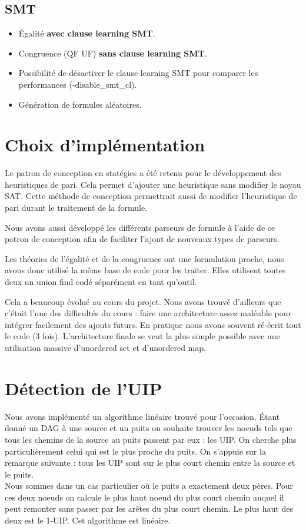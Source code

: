 \documentclass{article}
\begin{document}
\subsection{SMT}
\begin{itemize}
\item Égalité \textbf{avec clause learning SMT}.
\item Congruence (QF UF) \textbf{sans clause learning SMT}.
\item Possibilité de désactiver le clause learning SMT pour comparer les performances (-disable\_smt\_cl).
\item Génération de formules aléatoires.
\end{itemize}

\section{Choix d'implémentation}
Le patron de conception en statégies a été retenu pour le développement des heuristiques de pari. Cela permet d'ajouter une heuristique sans modifier le noyau SAT. 
Cette méthode de conception permettrait aussi de modifier l'heuristique de pari durant le traitement de la formule.

Nous avons aussi développé les différents parseurs de formule à l'aide de ce patron de conception afin de faciliter l'ajout de nouveaux types de parseurs.

Les théories de l'égalité et de la congruence ont une formulation proche, nous avons donc utilisé la même base de code pour les traiter.
Elles utilisent toutes deux un union find codé séparément en tant qu'outil.

Cela a beaucoup évolué au cours du projet. Nous avons trouvé d'ailleurs que c'était l'une des difficultés du cours : faire une architecture assez maléable pour intégrer facilement des ajouts futurs. En pratique nous avons souvent ré-écrit tout le code (3 fois).
L'architecture finale se veut la plus simple possible avec une utilisation massive d'unordered set et d'unordered map.

\section{Détection de l'UIP}
Nous avons implémenté un algorithme linéaire trouvé pour l'occasion. Étant donné un DAG à une source et un puits on souhaite trouver les noeuds tels que tous les chemins de la source au puits passent par eux : les UIP. On cherche plus particulièrement celui qui est le plus proche du puits.
On s'appuie sur la remarque suivante : tous les UIP sont sur le plus court chemin entre la source et le puits. \\
Nous sommes dans un cas particulier où le puits a exactement deux pères. Pour ces deux noeuds on calcule le plus haut noeud du plus court chemin auquel il peut remonter sans passer par les arêtes du plus court chemin. Le plus haut des deux est le 1-UIP. Cet algorithme est linéaire.
\end{document}
